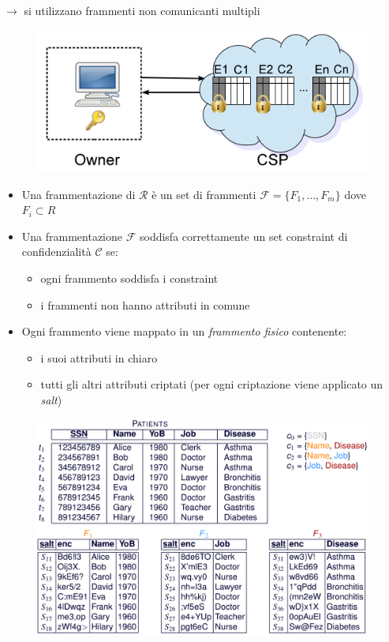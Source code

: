 \documentclass{report}
\begin{document}
$\rightarrow$ si utilizzano frammenti non comunicanti multipli

\begin{figure}[ht]
    \centering
    \includegraphics[width=0.7\linewidth]{images/encryption-fragmentation/multi-frag.png}
\end{figure}

\begin{itemize}
    \item Una frammentazione di $\mathcal{R}$ è un set di frammenti 
    $\mathcal{F} = \{ F_1, \dots, F_m\}$ dove $F_i \subset R$ 
    \item Una frammentazione $\mathcal{F}$ soddisfa correttamente un set constraint
    di confidenzialità $\mathcal{C}$ se:
    \begin{itemize}
        \item ogni frammento soddisfa i constraint
        \item i frammenti non hanno attributi in comune
    \end{itemize}
    \item Ogni frammento viene mappato in un \textit{frammento fisico} contenente:
    \begin{itemize}
        \item i suoi attributi in chiaro
        \item tutti gli altri attributi criptati (per ogni criptazione viene applicato un \textit{salt})
    \end{itemize}
\end{itemize}

\begin{figure}[ht]
    \centering
    \includegraphics[width=1\linewidth]{images/encryption-fragmentation/multi-ex.png}
\end{figure}
\end{document}
